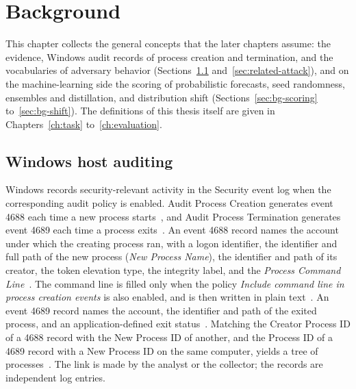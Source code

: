 \chapter{Background}
\label{ch:background}

This chapter collects the general concepts that the later chapters
assume: the evidence, Windows audit records of process creation and
termination, and the vocabularies of adversary behavior
(Sections~\ref{sec:bg-audit} and~\ref{sec:related-attack}), and on the
machine-learning side the scoring of probabilistic forecasts, seed
randomness, ensembles and distillation, and distribution shift
(Sections~\ref{sec:bg-scoring} to~\ref{sec:bg-shift}). The definitions
of this thesis itself are given in Chapters~\ref{ch:task}
to~\ref{ch:evaluation}.

\section{Windows host auditing}
\label{sec:bg-audit}

Windows records security-relevant activity in the Security event log
when the corresponding audit policy is enabled. Audit Process Creation
generates event 4688 each time a new process
starts~\cite{msauditprocesscreation,ms4688}, and Audit Process
Termination generates event 4689 each time a process
exits~\cite{ms4689}.
An event 4688 record names the account under which the creating
process ran, with a logon identifier, the identifier and full path of
the new process (\emph{New Process Name}), the identifier and path of
its creator, the token elevation type, the integrity label, and the
\emph{Process Command Line}~\cite{ms4688}. The command line is filled
only when the policy \emph{Include command line in process creation
events} is also enabled, and is then written in plain
text~\cite{ms4688,mscmdline}. An event 4689 record names the account,
the identifier and path of the exited process, and an
application-defined exit status~\cite{ms4689}.
Matching the Creator Process ID of a 4688 record with the New Process
ID of another, and the Process ID of a 4689 record with a New Process
ID on the same computer, yields a tree of
processes~\cite{ms4688,ms4689}. The link is made by the analyst or the
collector; the records are independent log entries.

